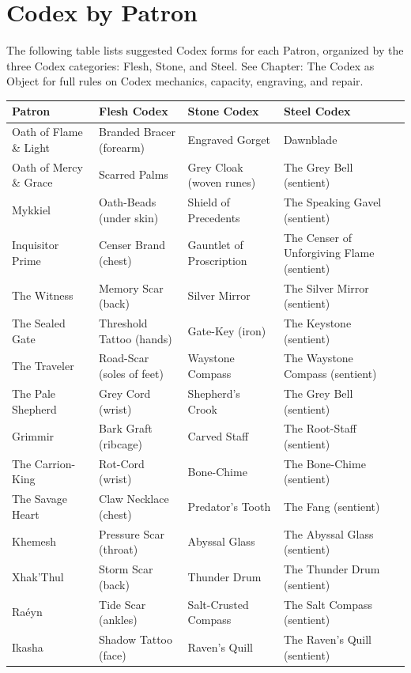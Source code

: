 \section{Codex by Patron}

The following table lists suggested Codex forms for each Patron, organized by the three Codex categories: Flesh, Stone, and Steel. See Chapter: The Codex as Object for full rules on Codex mechanics, capacity, engraving, and repair.

\begin{table}[h]
\centering
\small
\begin{tabular}{llll}
\hline
\textbf{Patron} & \textbf{Flesh Codex} & \textbf{Stone Codex} & \textbf{Steel Codex} \\
\hline
Oath of Flame \& Light & Branded Bracer (forearm) & Engraved Gorget & Dawnblade \\
Oath of Mercy \& Grace & Scarred Palms & Grey Cloak (woven runes) & The Grey Bell (sentient) \\
Mykkiel & Oath-Beads (under skin) & Shield of Precedents & The Speaking Gavel (sentient) \\
Inquisitor Prime & Censer Brand (chest) & Gauntlet of Proscription & The Censer of Unforgiving Flame (sentient) \\
The Witness & Memory Scar (back) & Silver Mirror & The Silver Mirror (sentient) \\
\hline
The Sealed Gate & Threshold Tattoo (hands) & Gate-Key (iron) & The Keystone (sentient) \\
The Traveler & Road-Scar (soles of feet) & Waystone Compass & The Waystone Compass (sentient) \\
The Pale Shepherd & Grey Cord (wrist) & Shepherd's Crook & The Grey Bell (sentient) \\
\hline
Grimmir & Bark Graft (ribcage) & Carved Staff & The Root-Staff (sentient) \\
The Carrion-King & Rot-Cord (wrist) & Bone-Chime & The Bone-Chime (sentient) \\
The Savage Heart & Claw Necklace (chest) & Predator's Tooth & The Fang (sentient) \\
\hline
Khemesh & Pressure Scar (throat) & Abyssal Glass & The Abyssal Glass (sentient) \\
Xhak'Thul & Storm Scar (back) & Thunder Drum & The Thunder Drum (sentient) \\
Raéyn & Tide Scar (ankles) & Salt-Crusted Compass & The Salt Compass (sentient) \\
\hline
Ikasha & Shadow Tattoo (face) & Raven's Quill & The Raven's Quill (sentient) \\

\end{tabular}
\end{table}
